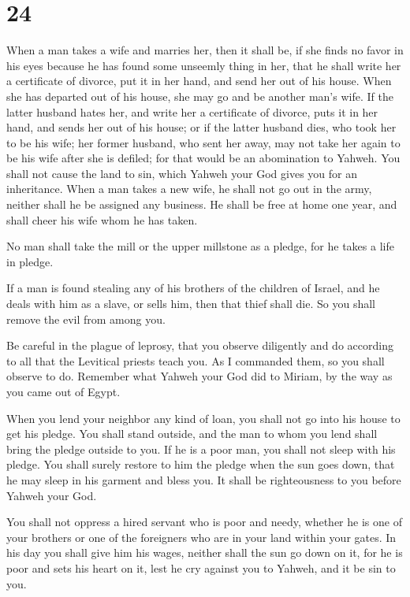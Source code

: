 \hypertarget{section-23}{%
\section{24}\label{section-23}}

 When a man takes a wife and marries her, then it shall
be, if she finds no favor in his eyes because he has found some unseemly
thing in her, that he shall write her a certificate of divorce, put it
in her hand, and send her out of his house.  When she has
departed out of his house, she may go and be another man's wife.
 If the latter husband hates her, and write her a
certificate of divorce, puts it in her hand, and sends her out of his
house; or if the latter husband dies, who took her to be his wife;
 her former husband, who sent her away, may not take her
again to be his wife after she is defiled; for that would be an
abomination to Yahweh. You shall not cause the land to sin, which Yahweh
your God gives you for an inheritance.  When a man takes a
new wife, he shall not go out in the army, neither shall he be assigned
any business. He shall be free at home one year, and shall cheer his
wife whom he has taken.

 No man shall take the mill or the upper millstone as a
pledge, for he takes a life in pledge.

 If a man is found stealing any of his brothers of the
children of Israel, and he deals with him as a slave, or sells him, then
that thief shall die. So you shall remove the evil from among you.

 Be careful in the plague of leprosy, that you observe
diligently and do according to all that the Levitical priests teach you.
As I commanded them, so you shall observe to do.  Remember
what Yahweh your God did to Miriam, by the way as you came out of Egypt.

 When you lend your neighbor any kind of loan, you shall
not go into his house to get his pledge.  You shall stand
outside, and the man to whom you lend shall bring the pledge outside to
you.  If he is a poor man, you shall not sleep with his
pledge.  You shall surely restore to him the pledge when
the sun goes down, that he may sleep in his garment and bless you. It
shall be righteousness to you before Yahweh your God.

 You shall not oppress a hired servant who is poor and
needy, whether he is one of your brothers or one of the foreigners who
are in your land within your gates.  In his day you shall
give him his wages, neither shall the sun go down on it, for he is poor
and sets his heart on it, lest he cry against you to Yahweh, and it be
sin to you.

